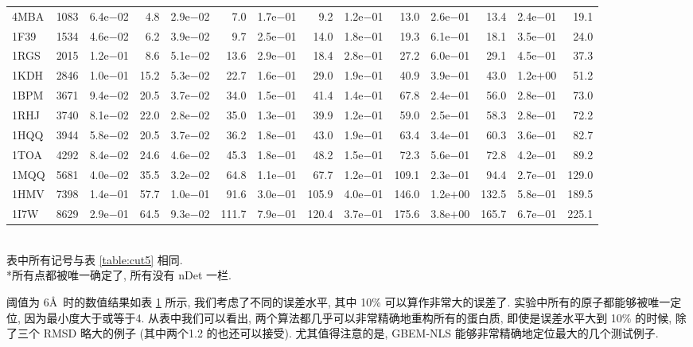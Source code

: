 \documentclass{CASthesis_zzk}
\begin{document}
\begin{table}[!htbp]
{\begin{tabular}{lrrrrrrrrrrrrr}
      4MBA & 1083 & 6.4e$-$02 &  4.8 & 2.9e$-$02 &   7.0 & 1.7e$-$01 &   9.2 & 1.2e$-$01&  13.0 & 2.6e$-$01 &  13.4 & 2.4e$-$01&  19.1  \\
      1F39 & 1534 & 4.6e$-$02 &  6.2 & 3.9e$-$02 &   9.7 & 2.5e$-$01 &  14.0 & 1.8e$-$01&  19.3 & 6.1e$-$01 &  18.1 & 3.5e$-$01&  24.0  \\
      1RGS & 2015 & 1.2e$-$01 &  8.6 & 5.1e$-$02 &  13.6 & 2.9e$-$01 &  18.4 & 2.8e$-$01&  27.2 & 6.0e$-$01 &  29.1 & 4.5e$-$01&  37.3  \\
      1KDH & 2846 & 1.0e$-$01 & 15.2 & 5.3e$-$02 &  22.7 & 1.6e$-$01 &  29.0 & 1.9e$-$01&  40.9 & 3.9e$-$01 &  43.0 & 1.2e$+$00&  51.2  \\
      1BPM & 3671 & 9.4e$-$02 & 20.5 & 3.7e$-$02 &  34.0 & 1.5e$-$01 &  41.4 & 1.4e$-$01&  67.8 & 2.4e$-$01 &  56.0 & 2.8e$-$01&  73.0  \\
      1RHJ & 3740 & 8.1e$-$02 & 22.0 & 2.8e$-$02 &  35.0 & 1.3e$-$01 &  39.9 & 1.2e$-$01&  59.0 & 2.5e$-$01 &  58.3 & 2.8e$-$01&  72.2  \\
      1HQQ & 3944 & 5.8e$-$02 & 20.5 & 3.7e$-$02 &  36.2 & 1.8e$-$01 &  43.0 & 1.9e$-$01&  63.4 & 3.4e$-$01 &  60.3 & 3.6e$-$01&  82.7  \\
      1TOA & 4292 & 8.4e$-$02 & 24.6 & 4.6e$-$02 &  45.3 & 1.8e$-$01 &  48.2 & 1.5e$-$01&  72.3 & 5.6e$-$01 &  72.8 & 4.2e$-$01&  89.2  \\
      1MQQ & 5681 & 4.0e$-$02 & 35.5 & 3.2e$-$02 &  64.8 & 1.1e$-$01 &  67.7 & 1.2e$-$01& 109.1 & 2.3e$-$01 &  94.4 & 2.7e$-$01& 129.0  \\
      1HMV & 7398 & 1.4e$-$01 & 57.7 & 1.0e$-$01 &  91.6 & 3.0e$-$01 & 105.9 & 4.0e$-$01& 146.0 & 1.2e$+$00 & 132.5 & 5.8e$-$01& 189.5  \\
      1I7W & 8629 & 2.9e$-$01 & 64.5 & 9.3e$-$02 & 111.7 & 7.9e$-$01 & 120.4 & 3.7e$-$01& 175.6 & 3.8e$+$00 & 165.7 & 6.7e$-$01& 225.1  \\
      \toprule
    \end{tabular}\\[-4mm]
    \label{table:cut6}                                                                  \bl *表中所有记号与表 \ref{table:cut5} 相同. \\
    *所有点都被唯一确定了, 所有没有 nDet 一栏.
    \el
  }
\end{table}

阈值为 6\AA~时的数值结果如表 \ref{table:cut6} 所示, 
我们考虑了不同的误差水平, 其中 10\% 可以算作非常大的误差了.
实验中所有的原子都能够被唯一定位, 因为最小度大于或等于4.
从表中我们可以看出, 两个算法都几乎可以非常精确地重构所有的蛋白质,
即使是误差水平大到 10\% 的时候, 除了三个 RMSD 略大的例子 
(其中两个1.2 的也还可以接受).
尤其值得注意的是, GBEM-NLS 能够非常精确地定位最大的几个测试例子.
\end{document}
